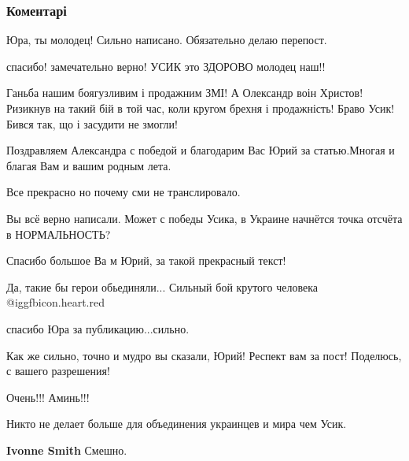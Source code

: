  
 
 
 
 
\subsubsection{Коментарі}
\label{sec:26_09_2021.fb.molchanov_jurij.1.usik_strana_pobeda.cmt}

\begin{itemize} %
Юра, ты молодец! Сильно написано. Обязательно делаю перепост.

спасибо! замечательно верно! УСИК это ЗДОРОВО молодец наш!!


Ганьба нашим боягузливим і продажним ЗМІ! А Олександр воін Христов! Ризикнув на
такий бій в той час, коли кругом брехня і продажність! Браво Усик! Бився так,
що і засудити не змогли!


Поздравляем Александра с победой и благодарим Вас Юрий за статью.Многая и благая Вам и вашим родным лета.

Все прекрасно но почему сми не транслировало.

Вы всё верно написали. Может с победы Усика, в Украине начнётся точка отсчёта в НОРМАЛЬНОСТЬ?

Спасибо большое Ва м Юрий, за такой прекрасный текст!

Да, такие бы герои обьединяли... Сильный бой крутого человека @igg{fbicon.heart.red}

спасибо Юра за публикацию...сильно.

Как же сильно, точно и мудро вы сказали, Юрий! Респект вам за пост! Поделюсь, с вашего разрешения!

Очень!!! Аминь!!!

Никто не делает больше для объединения украинцев и мира чем Усик.

\begin{itemize} %
\textbf{Ivonne Smith} Смешно.
\end{itemize} %


\end{itemize}
